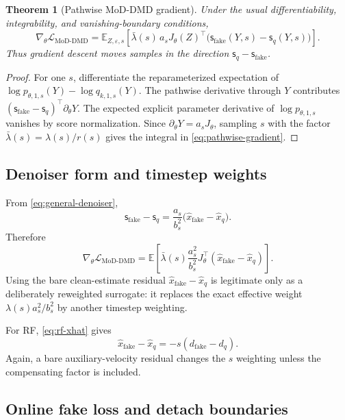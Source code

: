 \documentclass[11pt,a4paper]{article}
\newcommand{\E}{\mathbb{E}}
\newcommand{\fake}{\mathrm{fake}}
\newcommand{\score}{\mathsf{s}}
\newcommand{\xhat}{\widehat{x}}
\theoremstyle{plain}
\newtheorem{theorem}{Theorem}[section]
\theoremstyle{definition}
\begin{document}
\begin{theorem}[Pathwise MoD-DMD gradient]
\label{thm:dmd-gradient}
Under the usual differentiability, integrability, and vanishing-boundary conditions,
\begin{equation}
\boxed{
\nabla_\theta\mathcal L_{\mathrm{MoD\text{-}DMD}}
=\E_{Z,\varepsilon,s}\!\left[
\bar\lambda(s)\,a_sJ_\theta(Z)^\top
\bigl(\score_{\fake}(Y,s)-\score_q(Y,s)\bigr)
\right].
}
\label{eq:pathwise-gradient}
\end{equation}
Thus gradient descent moves samples in the direction
$\score_q-\score_{\fake}$.
\end{theorem}

\begin{proof}
For one $s$, differentiate the reparameterized expectation of
$\log p_{\theta,1,s}(Y)-\log q_{k,1,s}(Y)$.  The pathwise derivative through $Y$ contributes
$(\score_{\fake}-\score_q)^\top\partial_\theta Y$.  The expected explicit parameter derivative
of $\log p_{\theta,1,s}$ vanishes by score normalization.  Since
$\partial_\theta Y=a_sJ_\theta$, sampling $s$ with the factor
$\bar\lambda(s)=\lambda(s)/r(s)$ gives the integral in
\eqref{eq:pathwise-gradient}.
\end{proof}

\subsection{Denoiser form and timestep weights}

From \eqref{eq:general-denoiser},
\begin{equation}
\score_{\fake}-\score_q
=\frac{a_s}{b_s^2}
\bigl(\xhat_{\fake}-\xhat_q\bigr).
\label{eq:score-to-denoiser}
\end{equation}
Therefore
\begin{equation}
\boxed{
\nabla_\theta\mathcal L_{\mathrm{MoD\text{-}DMD}}
=\E\!\left[
\bar\lambda(s)\frac{a_s^2}{b_s^2}
J_\theta^\top(\xhat_{\fake}-\xhat_q)
\right].
}
\label{eq:denoiser-gradient}
\end{equation}
Using the bare clean-estimate residual
$\xhat_{\fake}-\xhat_q$ is legitimate only as a deliberately reweighted surrogate: it replaces
the exact effective weight $\lambda(s)a_s^2/b_s^2$ by another timestep weighting.

For RF, \eqref{eq:rf-xhat} gives
\[
\xhat_{\fake}-\xhat_q=-s(d_{\fake}-d_q).
\]
Again, a bare auxiliary-velocity residual changes the $s$ weighting unless the compensating
factor is included.

\subsection{Online fake loss and detach boundaries}
\end{document}
